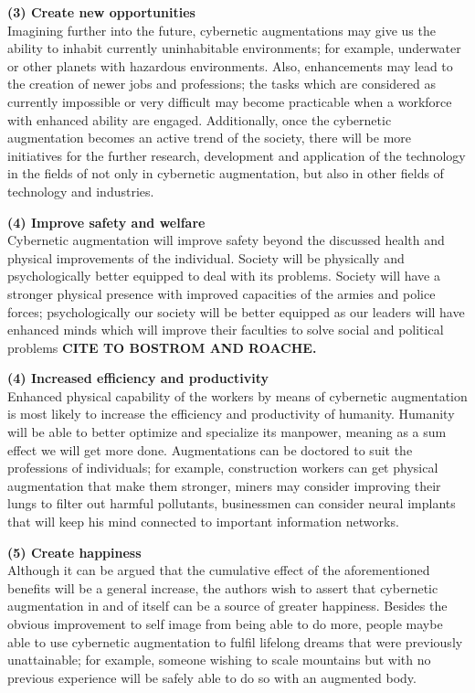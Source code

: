 {\bf (3) Create new opportunities}\\
Imagining further into the future, cybernetic augmentations may give us the ability to inhabit currently uninhabitable environments; for example, underwater or other planets with hazardous environments. Also, enhancements may lead to the creation of newer jobs and professions; the tasks which are considered as currently impossible or very difficult may become practicable when a workforce with enhanced ability are engaged. Additionally, once the cybernetic augmentation becomes an active trend of the society, there will be more initiatives for the further research, development and application of the technology in the fields of not only in cybernetic augmentation, but also in other fields of technology and industries.

{\bf (4) Improve safety and welfare}\\
Cybernetic augmentation will improve safety beyond the discussed health and physical improvements of the individual. Society will be physically and psychologically better equipped to deal with its problems. Society will have a stronger physical presence with improved capacities of the armies and police forces; psychologically our society will be better equipped as our leaders will have enhanced minds which will improve their faculties to solve social and political problems \bf{CITE TO BOSTROM AND ROACHE}.

{\bf (4) Increased efficiency and productivity} \\
Enhanced physical capability of the workers by means of cybernetic augmentation is most likely to increase the efficiency and productivity of humanity. Humanity will be able to better optimize and specialize its manpower, meaning as a sum effect we will get more done. Augmentations can be doctored to suit the professions of individuals; for example, construction workers can get physical augmentation that make them stronger, miners may consider improving their lungs to filter out harmful pollutants, businessmen can consider neural implants that will keep his mind connected to important information networks.

{\bf (5) Create happiness} \\
Although it can be argued that the cumulative effect of the aforementioned benefits will be a general increase, the authors wish to assert that cybernetic augmentation in and of itself can be a source of greater happiness. Besides the obvious improvement to self image from being able to do more, people maybe able to use cybernetic augmentation to fulfil lifelong dreams that were previously unattainable; for example, someone wishing to scale mountains but with no previous experience will be safely able to do so with an augmented body.



